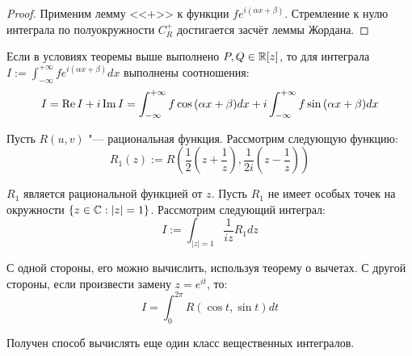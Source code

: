 \begin{proof}
	Применим лемму <<$+$>> к функции $fe^{i(\alpha x + \beta)}$. Стремление к нулю интеграла по полуокружности $C_R^+$ достигается засчёт леммы Жордана.
\end{proof}

\begin{unnecessary}
    \begin{note}
    	Если в условиях теоремы выше выполнено $P, Q \in \mathbb{R}[z]$, то для интеграла $I := \int_{-\infty}^{+\infty}fe^{i(\alpha x + \beta)}dx$ выполнены соотношения:
    	\[I = \operatorname{Re} I + i \operatorname{Im} I = \int_{-\infty}^{+\infty}f\cos{(\alpha x + \beta)}dx + i\int_{-\infty}^{+\infty}f\sin{(\alpha x + \beta)}dx\]
    \end{note}
    
    \begin{note}
    	Пусть $R(u, v)$ "--- рациональная функция. Рассмотрим следующую функцию:
    	\[R_1(z) := R\left(\frac12\left(z + \frac1z\right), \frac1{2i}\left(z - \frac1z\right)\right)\]
    	
    	$R_1$ является рациональной функцией от $z$. Пусть $R_1$ не имеет особых точек на окружности $\{z \in \mathbb{C} : |z| = 1\}$. Рассмотрим следующий интеграл:
    	\[I := \int_{|z| = 1}\frac{1}{iz}R_1dz\]
    	
    	С одной стороны, его можно вычислить, используя теорему о вычетах. С другой стороны, если произвести замену $z = e^{it}$, то:
    	\[I = \int_{0}^{2\pi} R(\cos{t}, \sin{t})dt\]
    	
    	Получен способ вычислять еще один класс вещественных интегралов.
    \end{note}
\end{unnecessary}